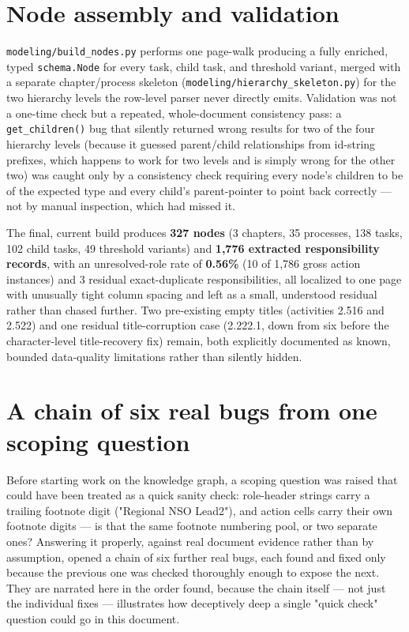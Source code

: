 \section{Node assembly and validation}
\texttt{modeling/\allowbreak{}build\_\allowbreak{}nodes.py} performs one page-walk producing a fully enriched, typed \texttt{schema.Node} for every task, child task, and threshold variant, merged with a separate chapter/process skeleton (\texttt{modeling/\allowbreak{}hierarchy\_\allowbreak{}skeleton.py}) for the two hierarchy levels the row-level parser never directly emits. Validation was not a one-time check but a repeated, whole-document consistency pass: a \texttt{get\_\allowbreak{}children()} bug that silently returned wrong results for two of the four hierarchy levels (because it guessed parent/child relationships from id-string prefixes, which happens to work for two levels and is simply wrong for the other two) was caught only by a consistency check requiring every node's children to be of the expected type and every child's parent-pointer to point back correctly — not by manual inspection, which had missed it.

The final, current build produces \textbf{327 nodes} (3 chapters, 35 processes, 138 tasks, 102 child tasks, 49 threshold variants) and \textbf{1,776 extracted responsibility records}, with an unresolved-role rate of \textbf{0.56\%} (10 of 1,786 gross action instances) and 3 residual exact-duplicate responsibilities, all localized to one page with unusually tight column spacing and left as a small, understood residual rather than chased further. Two pre-existing empty titles (activities 2.516 and 2.522) and one residual title-corruption case (2.222.1, down from six before the character-level title-recovery fix) remain, both explicitly documented as known, bounded data-quality limitations rather than silently hidden.

\section{A chain of six real bugs from one scoping question}
Before starting work on the knowledge graph, a scoping question was raised that could have been treated as a quick sanity check: role-header strings carry a trailing footnote digit ("Regional NSO Lead2"), and action cells carry their own footnote digits — is that the same footnote numbering pool, or two separate ones? Answering it properly, against real document evidence rather than by assumption, opened a chain of six further real bugs, each found and fixed only because the previous one was checked thoroughly enough to expose the next. They are narrated here in the order found, because the chain itself — not just the individual fixes — illustrates how deceptively deep a single "quick check" question could go in this document.


